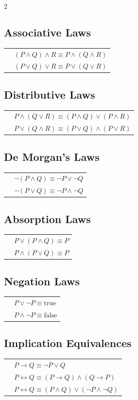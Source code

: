 \documentclass{article}
\begin{document}
\begin{multicols}{2}
\subsection*{Associative Laws}
\begin{tabular}{l l}
& $(P \land Q) \land R  \equiv P \land (Q \land R)$ \\
& $(P \lor Q) \lor R  \equiv P \lor (Q \lor R)$
\end{tabular}

\subsection*{Distributive Laws}
\begin{tabular}{l l}
& $P \land (Q \lor R)  \equiv (P \land Q) \lor (P \land R)$ \\
& $P \lor (Q \land R)  \equiv (P \lor Q) \land (P \lor R)$
\end{tabular}

\subsection*{De Morgan's Laws}
\begin{tabular}{l l}
& $\neg (P \land Q)  \equiv \neg P \lor \neg Q$ \\
& $\neg (P \lor Q)  \equiv \neg P \land \neg Q$
\end{tabular}

\subsection*{Absorption Laws}
\begin{tabular}{l l}
& $P \lor (P \land Q) \equiv P$ \\
& $P \land (P \lor Q) \equiv P$
\end{tabular}

\subsection*{Negation Laws}
\begin{tabular}{l l}
& $P \lor \neg P  \equiv \text{true}$ \\
& $P \land \neg P \equiv \text{false}$
\end{tabular}

\subsection*{Implication Equivalences}
\begin{tabular}{l l}
& $P \rightarrow Q  \equiv \neg P \lor Q$ \\
& $P \leftrightarrow Q  \equiv (P \rightarrow Q) \land (Q \rightarrow P)$ \\
& $P \leftrightarrow Q  \equiv (P \land Q) \lor (\neg P \land \neg Q)$
\end{tabular}


\end{multicols}
\end{document}
